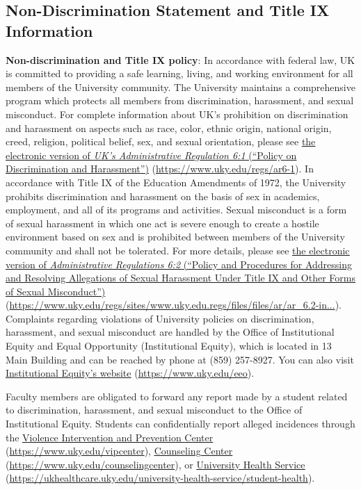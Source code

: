 \documentclass[
  letterpaper,
  DIV=11,
  numbers=noendperiod]{scrartcl}
\begin{document}
\hypertarget{non-discrimination-statement-and-title-ix-information}{%
\subsection{Non-Discrimination Statement and Title IX
Information}\label{non-discrimination-statement-and-title-ix-information}}

\textbf{Non-discrimination and Title IX policy}: In accordance with
federal law, UK is committed to providing a safe learning, living, and
working environment for all members of the University community. The
University maintains a comprehensive program which protects all members
from discrimination, harassment, and sexual misconduct. For complete
information about UK's prohibition on discrimination and harassment on
aspects such as race, color, ethnic origin, national origin, creed,
religion, political belief, sex, and sexual orientation, please see
\href{https://www.uky.edu/regs/ar6-1}{\uline{the electronic version of
\emph{UK's Administrative Regulation 6:1} (``Policy on Discrimination
and Harassment'')}} (\url{https://www.uky.edu/regs/ar6-1}). In
accordance with Title IX of the Education Amendments of 1972, the
University prohibits discrimination and harassment on the basis of sex
in academics, employment, and all of its programs and activities. Sexual
misconduct is a form of sexual harassment in which one act is severe
enough to create a hostile environment based on sex and is prohibited
between members of the University community and shall not be tolerated.
For more details, please see
\href{https://www.uky.edu/regs/sites/www.uky.edu.regs/files/files/ar/ar_6.2-interim-final_08_14_20_1.pdf}{\uline{the
electronic version of \emph{Administrative Regulations 6:2} (``Policy
and Procedures for Addressing and Resolving Allegations of Sexual
Harassment Under Title IX and Other Forms of Sexual Misconduct'')}}
(\href{https://www.uky.edu/regs/sites/www.uky.edu.regs/files/files/ar/ar_6.2-interim-final_08_14_20_1.pdf}{https://www.uky.edu/regs/sites/www.uky.edu.regs/files/files/ar/ar\_6.2-in...}).
Complaints regarding violations of University policies on
discrimination, harassment, and sexual misconduct are handled by the
Office of Institutional Equity and Equal Opportunity (Institutional
Equity), which is located in 13 Main Building and can be reached by
phone at (859) 257-8927. You can also visit
\href{https://www.uky.edu/eeo/}{\uline{Institutional Equity's website}}
(\url{https://www.uky.edu/eeo}).

Faculty members are obligated to forward any report made by a student
related to discrimination, harassment, and sexual misconduct to the
Office of Institutional Equity. Students can confidentially report
alleged incidences through the
\href{https://www.uky.edu/vipcenter/}{\uline{Violence Intervention and
Prevention Center}} (\url{https://www.uky.edu/vipcenter}),
\href{https://www.uky.edu/counselingcenter/}{\uline{Counseling Center}}
(\url{https://www.uky.edu/counselingcenter}), or
\href{https://ukhealthcare.uky.edu/university-health-service/student-health}{\uline{University
Health Service}}
(\url{https://ukhealthcare.uky.edu/university-health-service/student-health}).
\end{document}
